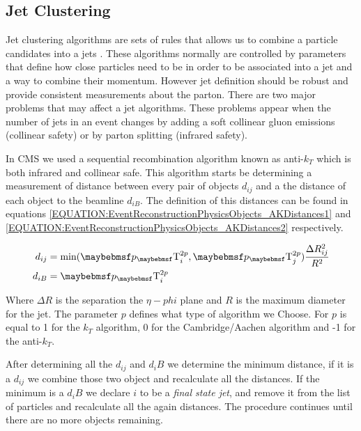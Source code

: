 \subsection{Jet Clustering}
\label{SECTION:EventReconstructionPhysicsObjects_Jets_JetClustering}


Jet clustering algorithms are sets of rules that allows us to combine a particle candidates into a jets \cite{ARTICLE:TowardsJetography}. These algorithms normally are controlled by parameters that define how close particles need to be in order to be associated into a jet and a way to combine their momentum. However jet definition should be robust and provide consistent measurements about the parton. There are two major problems that may affect a jet algorithms. These problems appear when the number of jets in an event changes by adding a soft collinear gluon emissions (collinear safety) or by parton splitting (infrared safety). 

In \gls{CMS} we used a sequential recombination algorithm known as anti-$k_T$ \cite{ARTICLE:AntiKtAlgorithm} which is both infrared and collinear safe. This algorithm starts be determining a measurement of distance between every pair of objects $d_{ij}$ and a the distance of each object to the beamline $d_{iB}$. The definition of this distances can be found in equations \ref{EQUATION:EventReconstructionPhysicsObjects_AKDistances1} and \ref{EQUATION:EventReconstructionPhysicsObjects_AKDistances2} respectively. 

\begin{align}
d_{ij} &= \text{min}({\pT}_{i}^{2p},{\pT}_{j}^{2p})\frac{\Delta R_{ij}^{2}}{R^{2}} \label{EQUATION:EventReconstructionPhysicsObjects_AKDistances1} \\
d_{iB} &= {\pT}_{i}^{2p}\ \label{EQUATION:EventReconstructionPhysicsObjects_AKDistances2} 
\end{align}

Where $\Delta R$ is the separation the $\eta-phi$ plane and $R$ is the maximum diameter for the jet. The parameter $p$ defines what type of algorithm we Choose. For $p$ is equal to 1 for the $k_T$ algorithm, 0 for the Cambridge/Aachen algorithm and -1 for the anti-$k_T$. 

After determining all the $d_{ij}$ and $d_iB$ we determine the minimum distance, if it is a $d_{ij}$ we combine those two object and recalculate all the distances. If the minimum is a $d_iB$ we declare $i$ to be a \textit{final state jet}, and remove it from the list of particles and recalculate all the again distances. The procedure continues until there are no more objects remaining.


